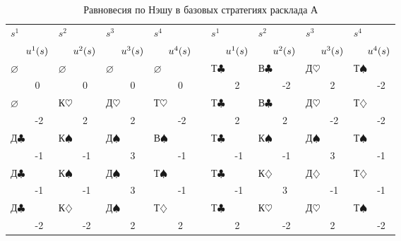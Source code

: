 \begin{table}[htbp]
	\centering
	\caption{Равновесия по Нэшу в базовых стратегиях расклада А}
	\label{tab:cards4}
	\begin{SingleSpace}
		\newcommand{\PreserveBackslash}[1]{\let\temp=\\#1\let\\=\temp}
		\newcolumntype{R}{>{\PreserveBackslash\raggedleft}p{0.5cm}}
		\newcolumntype{L}{>{\PreserveBackslash\raggedright}p{0.5cm}}
		\begin{tabular}{|LR|LR|LR|LR|c|LR|LR|LR|RL|}
			 
			$s^1$ & & $s^2$ & & $s^3$ & & $s^4$ & & & $s^1$ & & $s^2$ & & $s^3$ & & $s^4$ & \\
			& $\mkern-18mu u^1(s)$ & & $\mkern-18mu u^2(s)$ & & $\mkern-18mu u^3(s)$ & & $\mkern-18mu u^4(s)$ & & & $\mkern-18mu u^1(s)$ & & $\mkern-18mu u^2(s)$ & & $\mkern-18mu u^3(s)$ & & $\mkern-18mu u^4(s)$ \\
			\hhline{|========|~|========|}
			$\varnothing$ & & $\varnothing$ & & $\varnothing$ & & $\varnothing$ & & & Т$\clubsuit$ & & В$\clubsuit$ & & Д$\heartsuit$ & & Т$\spadesuit$ & \\
			& 0 & & 0 & & 0 & & 0 & & & 2 & & -2 & & 2 & & -2 \\
			 
			$\varnothing$ & & К$\heartsuit$ & & Д$\heartsuit$ & & Т$\heartsuit$ & & & Т$\clubsuit$ & & В$\clubsuit$ & & Д$\heartsuit$ & & Т$\diamondsuit$ & \\
			& -2 & & 2 & & 2 & & -2 & & & 2 & & 2 & & -2 & & -2 \\
			 
			Д$\clubsuit$ & & К$\spadesuit$ & & Д$\spadesuit$ & & В$\spadesuit$ & & & Т$\clubsuit$ & & К$\spadesuit$ & & Д$\spadesuit$ & & Т$\spadesuit$ & \\
			& -1 & & -1 & & 3 & & -1 & & & -1 & & -1 & & 3 & & -1 \\
			 
			Д$\clubsuit$ & & К$\spadesuit$ & & Д$\spadesuit$ & & Т$\spadesuit$ & & & Т$\clubsuit$ & & К$\diamondsuit$ & & Д$\diamondsuit$ & & Т$\diamondsuit$ & \\
			& -1 & & -1 & & 3 & & -1 & & & -1 & & 3 & & -1 & & -1 \\
			 
			Д$\clubsuit$ & & К$\diamondsuit$ & & Д$\spadesuit$ & & Т$\diamondsuit$ & & & Т$\clubsuit$ & & К$\heartsuit$ & & Д$\heartsuit$ & & Т$\spadesuit$ & \\
			& -2 & & -2 & & 2 & & 2 & & & 2 & & -2 & & 2 & & -2 \\
			 

\end{tabular}
\end{SingleSpace}
\end{table}
